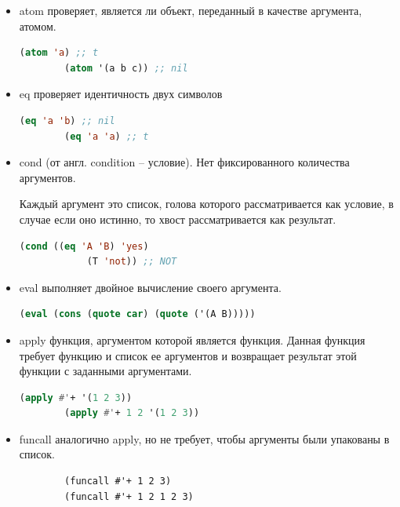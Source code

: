 \begin{itemize}
	\item atom проверяет, является ли объект, переданный в качестве аргумента, атомом.
	
		\begin{lstlisting}[language=Lisp]
		(atom 'a) ;; t
		(atom '(a b c)) ;; nil
		\end{lstlisting}
	
	\item eq проверяет идентичность двух символов
	
		\begin{lstlisting}[language=Lisp]
		(eq 'a 'b) ;; nil
		(eq 'a 'a) ;; t
		\end{lstlisting}
	
	\item cond (от англ. condition -- условие). Нет фиксированного количества аргументов. 
	
		Каждый аргумент это список, голова которого рассматривается как условие, в случае если оно истинно, то хвост рассматривается как результат.
		
		\begin{lstlisting}[language=Lisp]
		(cond ((eq 'A 'B) 'yes)
			(T 'not)) ;; NOT
		\end{lstlisting}
	
	\item eval выполняет двойное вычисление своего аргумента.
	
		\begin{lstlisting}[language=Lisp]
		(eval (cons (quote car) (quote ('(A B))))) 
		\end{lstlisting}
	
	
	\item apply функция, аргументом которой является функция. Данная функция требует функцию и список ее аргументов и возвращает результат этой функции с заданными аргументами. 
	
		\begin{lstlisting}[language=Lisp]
		(apply #'+ '(1 2 3))
		(apply #'+ 1 2 '(1 2 3))
		\end{lstlisting}
	
	
	\item funcall аналогично apply, но не требует, чтобы аргументы были упакованы в список.
	
	
		\begin{lstlisting}
		(funcall #'+ 1 2 3)
		(funcall #'+ 1 2 1 2 3)
		\end{lstlisting}

\end{itemize}

